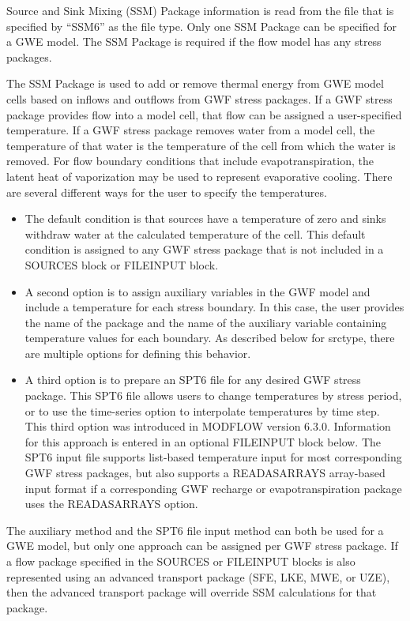 Source and Sink Mixing (SSM) Package information is read from the file that is specified by ``SSM6'' as the file type.  Only one SSM Package can be specified for a GWE model.  The SSM Package is required if the flow model has any stress packages.

The SSM Package is used to add or remove thermal energy from GWE model cells based on inflows and outflows from GWF stress packages.  If a GWF stress package provides flow into a model cell, that flow can be assigned a user-specified temperature.  If a GWF stress package removes water from a model cell, the temperature of that water is the temperature of the cell from which the water is removed.  For flow boundary conditions that include evapotranspiration, the latent heat of vaporization may be used to represent evaporative cooling.  There are several different ways for the user to specify the temperatures.  

\begin{itemize}
\item The default condition is that sources have a temperature of zero and sinks withdraw water at the calculated temperature of the cell.  This default condition is assigned to any GWF stress package that is not included in a SOURCES block or FILEINPUT block.
\item A second option is to assign auxiliary variables in the GWF model and include a temperature for each stress boundary.  In this case, the user provides the name of the package and the name of the auxiliary variable containing temperature values for each boundary.  As described below for srctype, there are multiple options for defining this behavior.
\item A third option is to prepare an SPT6 file for any desired GWF stress package.  This SPT6 file allows users to change temperatures by stress period, or to use the time-series option to interpolate temperatures by time step.  This third option was introduced in MODFLOW version 6.3.0.  Information for this approach is entered in an optional FILEINPUT block below.  The SPT6 input file supports list-based temperature input for most corresponding GWF stress packages, but also supports a READASARRAYS array-based input format if a corresponding GWF recharge or evapotranspiration package uses the READASARRAYS option.
\end{itemize}

\noindent The auxiliary method and the SPT6 file input method can both be used for a GWE model, but only one approach can be assigned per GWF stress package.   If a flow package specified in the SOURCES or FILEINPUT blocks is also represented using an advanced transport package (SFE, LKE, MWE, or UZE), then the advanced transport package will override SSM calculations for that package.

